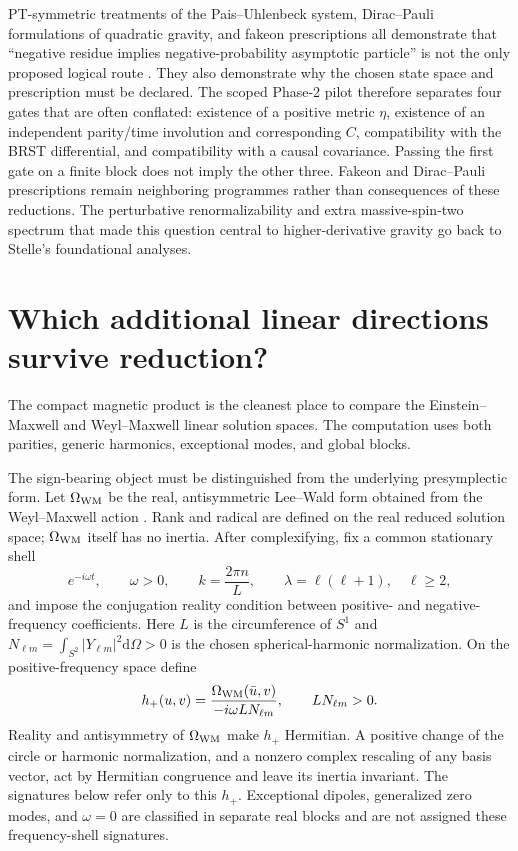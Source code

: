 \documentclass[11pt]{article}
\newcommand{\dd}{\mathrm d}
\begin{document}
PT-symmetric treatments of the Pais--Uhlenbeck system, Dirac--Pauli
formulations of quadratic gravity, and fakeon prescriptions all demonstrate
that ``negative residue implies negative-probability asymptotic particle'' is
not the only proposed logical route
\cite{BenderMannheim,Salvio,Anselmi}.  They also demonstrate why the chosen
state space and prescription must be declared.  The scoped Phase-2 pilot
therefore separates four gates that are often conflated: existence of a
positive metric $\eta$, existence of an independent parity/time involution
and corresponding $C$, compatibility with the BRST differential, and
compatibility with a causal covariance.  Passing the first gate on a finite
block does not imply the other three.  Fakeon and Dirac--Pauli prescriptions
remain neighboring programmes rather than consequences of these reductions.
The perturbative renormalizability and extra massive-spin-two spectrum that
made this question central to higher-derivative gravity go back to
Stelle's foundational analyses\cite{Stelle1977,Stelle1978}.

\section{Which additional linear directions survive reduction?}

The compact magnetic product is the cleanest place to compare the
Einstein--Maxwell and Weyl--Maxwell linear solution spaces.  The computation
uses both parities, generic harmonics, exceptional modes, and global blocks.

The sign-bearing object must be distinguished from the underlying
presymplectic form.  Let $\Omega_{\rm WM}$ be the real, antisymmetric
Lee--Wald form obtained from the Weyl--Maxwell action
\cite{LeeWald,IyerWald}.  Rank and radical are defined on the real reduced
solution space; $\Omega_{\rm WM}$ itself has no inertia.  After complexifying,
fix a common stationary shell
\begin{equation}
 e^{-i\omega t},\qquad \omega>0,\qquad
 k=\frac{2\pi n}{L},\qquad \lambda=\ell(\ell+1),\quad \ell\ge2,
\end{equation}
and impose the conjugation reality condition between positive- and
negative-frequency coefficients.  Here $L$ is the circumference of $S^1$ and
$N_{\ell m}=\int_{S^2}|Y_{\ell m}|^2\dd\Omega>0$ is the chosen spherical-harmonic
normalization.  On the positive-frequency space define
\begin{equation}
 h_+(u,v)=\frac{\Omega_{\rm WM}(\bar u,v)}
 {-i\omega L N_{\ell m}},
 \qquad L N_{\ell m}>0.
 \label{eq:positive-frequency-current}
\end{equation}
Reality and antisymmetry of $\Omega_{\rm WM}$ make $h_+$ Hermitian.  A
positive change of the circle or harmonic normalization, and a nonzero
complex rescaling of any basis vector, act by Hermitian congruence and leave
its inertia invariant.  The signatures below refer only to this $h_+$.
Exceptional dipoles, generalized zero modes, and $\omega=0$ are classified
in separate real blocks and are not assigned these frequency-shell
signatures.
\end{document}
